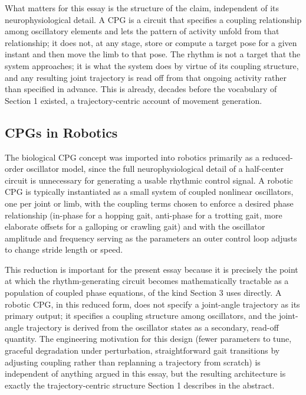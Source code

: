 \documentclass[12pt]{article}
\begin{document}
What matters for this essay is the structure of the claim, independent of its neurophysiological detail. A CPG is a circuit that specifies a coupling relationship among oscillatory elements and lets the pattern of activity unfold from that relationship; it does not, at any stage, store or compute a target pose for a given instant and then move the limb to that pose. The rhythm is not a target that the system approaches; it is what the system does by virtue of its coupling structure, and any resulting joint trajectory is read off from that ongoing activity rather than specified in advance. This is already, decades before the vocabulary of Section 1 existed, a trajectory-centric account of movement generation.

\subsection{CPGs in Robotics}

The biological CPG concept was imported into robotics primarily as a reduced-order oscillator model, since the full neurophysiological detail of a half-center circuit is unnecessary for generating a usable rhythmic control signal. A robotic CPG is typically instantiated as a small system of coupled nonlinear oscillators, one per joint or limb, with the coupling terms chosen to enforce a desired phase relationship (in-phase for a hopping gait, anti-phase for a trotting gait, more elaborate offsets for a galloping or crawling gait) and with the oscillator amplitude and frequency serving as the parameters an outer control loop adjusts to change stride length or speed.

This reduction is important for the present essay because it is precisely the point at which the rhythm-generating circuit becomes mathematically tractable as a population of coupled phase equations, of the kind Section 3 uses directly. A robotic CPG, in this reduced form, does not specify a joint-angle trajectory as its primary output; it specifies a coupling structure among oscillators, and the joint-angle trajectory is derived from the oscillator states as a secondary, read-off quantity. The engineering motivation for this design (fewer parameters to tune, graceful degradation under perturbation, straightforward gait transitions by adjusting coupling rather than replanning a trajectory from scratch) is independent of anything argued in this essay, but the resulting architecture is exactly the trajectory-centric structure Section 1 describes in the abstract.
\end{document}
